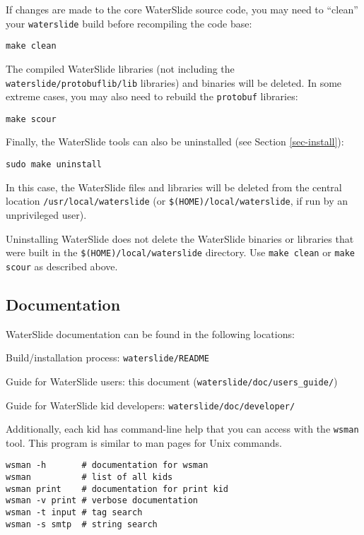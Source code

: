 \documentclass[11pt]{article}
\begin{document}
If changes are made to the core WaterSlide source code, you may need to ``clean'' your
\texttt{waterslide} build before recompiling the code base:
\nopagebreak
\begin{lstlisting}
make clean
\end{lstlisting}
The compiled WaterSlide libraries (not including the \texttt{waterslide/protobuflib/lib} libraries) and
binaries will be deleted. In some extreme cases, you may also need to rebuild the \texttt{protobuf}
libraries:
\nopagebreak
\begin{lstlisting}
make scour
\end{lstlisting}
Finally, the WaterSlide tools can also be uninstalled (see Section \ref{sec-install}):
\nopagebreak
\begin{lstlisting}
sudo make uninstall
\end{lstlisting}
In this case, the WaterSlide files and libraries will be deleted from the central location
\texttt{/usr/local/waterslide} (or \texttt{\$(HOME)/local/waterslide}, if run by an unprivileged user).

Uninstalling WaterSlide does not delete the WaterSlide binaries or libraries that were built in the
\texttt{\$(HOME)/local/waterslide} directory. Use \texttt{make clean} or \texttt{make scour} as
described above.

\subsection{Documentation}

WaterSlide documentation can be found in the following locations:
\nopagebreak
\begin{itemize*}
\item Build/installation process: \texttt{waterslide/README}
\item Guide for WaterSlide users: this document (\texttt{waterslide/doc/users\_guide/})
\item Guide for WaterSlide kid developers: \texttt{waterslide/doc/developer/}
\end{itemize*}
Additionally, each kid has command-line help that you can access with the \texttt{wsman}
tool. This program is similar to man pages for Unix
commands. 

\begin{lstlisting}
wsman -h       # documentation for wsman
wsman          # list of all kids
wsman print    # documentation for print kid
wsman -v print # verbose documentation
wsman -t input # tag search
wsman -s smtp  # string search
\end{lstlisting}
\end{document}
